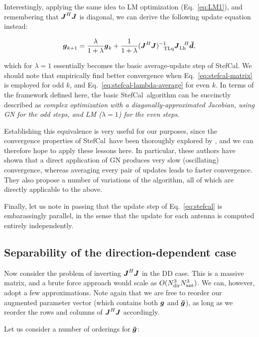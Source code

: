\documentclass[useAMS,usenatbib]{mn2e}
\newcommand{\mat}[1]{{\bmath{#1}}}
\newcommand{\JJ}{\mat{J}} %
\newcommand{\JHJ}{\JJ^H\JJ} %
\newcommand{\StefCal}{{\sc StefCal}}
\begin{document}
Interestingly, applying the same idea to LM optimization (Eq.~\ref{eq:LM1}), and remembering that $\JHJ$ is 
diagonal, we can derive the following update equation instead:

\begin{equation}
\bmath{g}_{k+1} = \frac{\lambda}{1+\lambda}\bmath{g}_k + \frac{1}{1+\lambda} (\JHJ)_{~~\UL}^{-1} \JJ_\LEFT^{~~H} \Dd,
\label{eq:stefcal-lambda-average}
\end{equation}

which for $\lambda=1$ essentially becomes the basic average-update step of \StefCal. We should note that \citet{Stefcal}
empirically find better convergence when Eq.~\ref{eq:stefcal-matrix} is employed for odd $k$, and 
Eq.~\ref{eq:stefcal-lambda-average} for even $k$. In terms of the framework defined here, the basic \StefCal\ algorithm 
can be succinctly described as {\em complex optimization with a 
diagonally-approximated Jacobian, using GN for the odd steps, and LM ($\lambda=1$) for the even steps}.

Establishing this equivalence is 
very useful for our purposes, since the convergence properties of \StefCal\ have been thoroughly explored 
by \citet{Stefcal}, and we can therefore hope to apply these lessons here. In particular, these authors have shown 
that a direct application of GN produces very slow (oscillating) convergence, whereas averaging every pair of 
updates leads to faster convergence. They also propose a number of variations of the algorithm, all of which are 
directly applicable to the above.

Finally, let us note in passing that the update step of Eq.~\ref{eq:stefcal} is embarassingly parallel, in the sense 
that the update for each antenna is computed entirely independently.

\subsection{Separability of the direction-dependent case}

Now consider the problem of inverting $\JHJ$ in the DD case. This is a massive matrix, and a brute force 
approach would scale as $O(N_\mathrm{dir}^3N_\mathrm{ant}^3)$. We can, however, adopt a few approximations. Note again that we are 
free to reorder our augmented parameter vector (which contains both $\bmath{g}$ and $\bmath{\bar g}$), 
as long as we reorder the rows and columns of $\JHJ$ accordingly.

Let us consider a number of orderings for $\Gg$:
\end{document}
